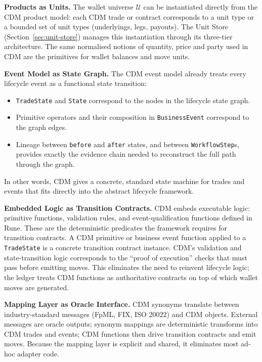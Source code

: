 \documentclass[11pt,a4paper]{article}
\begin{document}
\noindent\textbf{Products as Units.} The wallet universe $\mathcal{U}$ can be instantiated directly from the CDM product model: each CDM trade or contract corresponds to a unit type or a bounded set of unit types (underlyings, legs, payouts). The Unit Store (Section~\ref{sec:unit-store}) manages this instantiation through its three-tier architecture. The same normalised notions of quantity, price and party used in CDM are the primitives for wallet balances and move units.

\noindent\textbf{Event Model as State Graph.} The CDM event model already treats every lifecycle event as a functional state transition:
\begin{itemize}[nosep]
\item \texttt{TradeState} and \texttt{State} correspond to the nodes in the lifecycle state graph.
\item Primitive operators and their composition in \texttt{BusinessEvent} correspond to the graph edges.
\item Lineage between \texttt{before} and \texttt{after} states, and between \texttt{WorkflowStep}s, provides exactly the evidence chain needed to reconstruct the full path through the graph.
\end{itemize}
In other words, CDM gives a concrete, standard state machine for trades and events that fits directly into the abstract lifecycle framework.

\noindent\textbf{Embedded Logic as Transition Contracts.} CDM embeds executable logic: primitive functions, validation rules, and event-qualification functions defined in Rune. These are the deterministic predicates the framework requires for transition contracts. A CDM primitive or business event function applied to a \texttt{TradeState} is a concrete transition contract instance. CDM's validation and state-transition logic corresponds to the ``proof of execution'' checks that must pass before emitting moves. This eliminates the need to reinvent lifecycle logic; the ledger treats CDM functions as authoritative contracts on top of which wallet moves are generated.

\noindent\textbf{Mapping Layer as Oracle Interface.} CDM synonyms translate between industry-standard messages (FpML, FIX, ISO 20022) and CDM objects. External messages are oracle outputs; synonym mappings are deterministic transforms into CDM trades and events; CDM functions then drive transition contracts and emit moves. Because the mapping layer is explicit and shared, it eliminates most ad-hoc adapter code.
\end{document}
